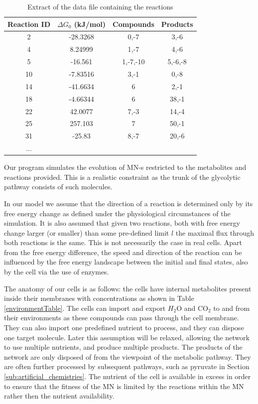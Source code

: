 \documentclass[a4paper,12pt]{article}
\begin{document}
	\begin{table}[htpb]
		\centering
		\begin{tabular}{cccc}
		Reaction ID &	$\Delta G_0$ (kJ/mol) & Compounds & Products \\ \hline
		2 &	-28.3268           & 0,-7      & 3,-6     \\
		4 &	8.24999            & 1,-7      & 4,-6     \\
		5 &	-16.561            & 1,-7,-10  & 5,-6,-8  \\
		10 &	-7.83516           & 3,-1      & 0,-8     \\
		14 &	-41.6634           & 6         & 2,-1     \\
		18 &	-4.66344           & 6         & 38,-1    \\
		22 &	42.0077            & 7,-3      & 14,-4    \\
		25 &	257.103            & 7         & 50,-1    \\
		31 &	-25.83             & 8,-7      & 20,-6    \\
		...&           &         
		\end{tabular}
		\caption{Extract of the data file containing the reactions}
		\label{tab:reacs}
	\end{table}
	
	Our program simulates the evolution of MN-s restricted to the metabolites and reactions provided. This is a realistic constraint as the trunk of the glycolytic pathway consists of such molecules.

	In our model we assume that the direction of a reaction is determined only by its free energy change as defined under the physiological circumstances of the simulation. It is also assumed that given two reactions, both with free energy change larger (or smaller) than some pre-defined limit $l$ the maximal flux through both reactions is the same. This is not necessarily the case in real cells. Apart from the free energy difference, the speed and direction of the reaction can be influenced by the free energy landscape between the initial and final states, also by the cell via the use of enzymes. 

	The anatomy of our cells is as follows: the cells have internal metabolites present inside  their membranes with concentrations as shown in Table \ref{environmentTable}. The cells can import and export $H_2$O and CO$_2$ to and from their environments as these compounds can pass through the cell membrane. They can also import one predefined nutrient to process, and they can dispose one target molecule. Later this assumption will be relaxed, allowing the network to use multiple nutrients, and produce multiple products. The products of the network are only disposed of from the viewpoint of the metabolic pathway. They are often further processed by subsequent pathways, such as pyruvate in Section \ref{sub:artificial_chemistries}. The nutrient of the cell is available in excess in order to ensure that the fitness of the MN is limited by the reactions within the MN rather then the nutrient availability. 
	
\end{document}
